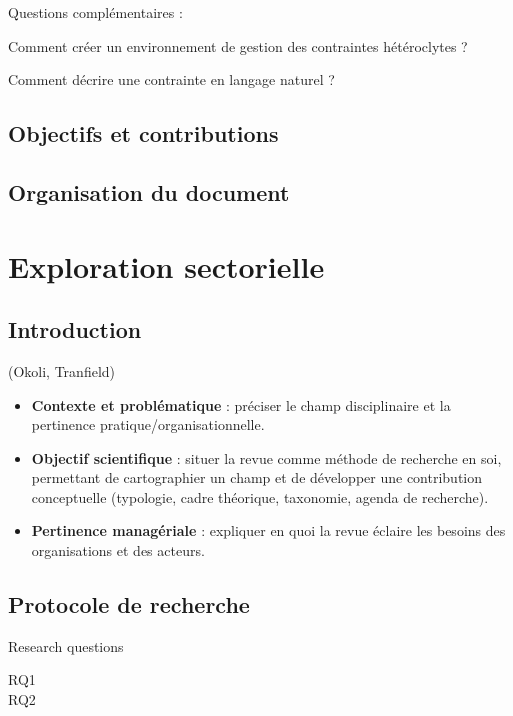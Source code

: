 \documentclass[a4paper,12pt]{article}
\begin{document}
Questions complémentaires :

Comment créer un environnement de gestion des contraintes hétéroclytes ?

Comment décrire une contrainte en langage naturel ?
\subsection{Objectifs et contributions}
\label{sec:org79dc226}

\subsection{Organisation du document}
\label{sec:org10f470c}
\clearpage
\section{Exploration sectorielle}
\label{sec:org5d7417c}
\subsection{Introduction}
\label{sec:org9c3155f}
(Okoli, Tranfield)
\begin{itemize}
\item \textbf{\textbf{Contexte et problématique}} : préciser le champ disciplinaire et la pertinence pratique/organisationnelle.
\item \textbf{\textbf{Objectif scientifique}} : situer la revue comme méthode de recherche en soi, permettant de cartographier un champ et de développer une contribution conceptuelle (typologie, cadre théorique, taxonomie, agenda de recherche).
\item \textbf{\textbf{Pertinence managériale}} : expliquer en quoi la revue éclaire les besoins des organisations et des acteurs.
\end{itemize}
\subsection{Protocole de recherche}
\label{sec:orgf5eb110}
Research questions
\begin{description}
\item[{RQ1}] 

\item[{RQ2}] 
\end{description}
\end{document}
